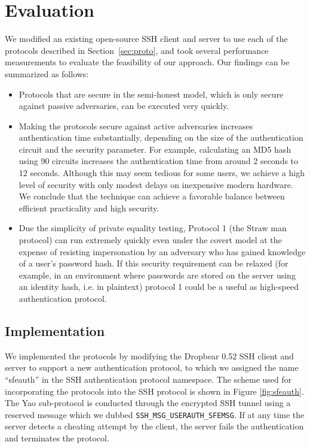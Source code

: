 
\section{Evaluation}
\label{sec:eval}

We modified an existing open-source SSH client and server to use each
of the protocols described in Section~\ref{sec:proto}, and took
several performance measurements to evaluate the feasibility of our
approach. Our findings can be summarized as follows:
\begin{itemize}
\item Protocols that are secure in the semi-honest model, which is only 
secure against passive adversaries, can be executed very quickly.
\item Making the protocols secure against active adversaries
increases authentication time substantially, depending on the size of
the authentication circuit and the security parameter.  For example,
calculating an MD5 hash using 90 circuits increases the authentication
time from around 2 seconds to 12 seconds.  Although this may seem
tedious for some users, we achieve a high level of security with only
modest delays on inexpensive modern hardware.  We conclude that the technique
can achieve a favorable balance between efficient practicality and high
security.

\item Due the simplicity of private equality testing, Protocol 1 (the Straw man protocol)
can run extremely quickly even under the covert model at the expense
of resisting impersonation by an adversary who has gained knowledge of
a user's password hash.  If this security requirement can be relaxed
(for example, in an environment where passwords are stored on the
server using an identity hash, i.e. in plaintext) protocol 1 could be
a useful as high-speed authentication protocol.
\end{itemize}

\subsection{Implementation}

We implemented the protocols by modifying the Dropbear 0.52 SSH client
and server to support a new authentication protocol, to which we
assigned the name {}``sfeauth'' in the SSH authentication protocol
namespace. The scheme used for incorporating the protocols into the
SSH protocol is shown in Figure \ref{fig:sfeauth}. The Yao
sub-protocol is conducted through the encrypted SSH tunnel using a
reserved message which we dubbed
\texttt{SSH\_MSG\_USERAUTH\_SFEMSG}. If at any time the server detects
a cheating attempt by the client, the server fails the authentication
and terminates the protocol.

